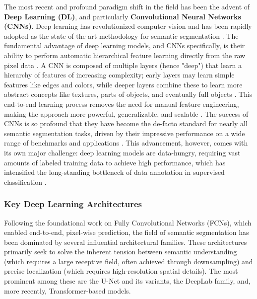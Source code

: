 \documentclass{report}
\begin{document}
The most recent and profound paradigm shift in the field has been the advent of \textbf{Deep Learning (DL)}, and particularly \textbf{Convolutional Neural Networks (CNNs)}. Deep learning has revolutionized computer vision and has been rapidly adopted as the state-of-the-art methodology for semantic segmentation \parencites[p.~311f.;]{KotaridisLazaridouRemotesensingimagesegmentationadvancesmetaanalysis2021a}[p.~1f.]{LeiEtAlDeeplearningimplementationimagesegmentationagriculturalapplicationscomprehensivereview2024}. The fundamental advantage of deep learning models, and CNNs specifically, is their ability to perform automatic hierarchical feature learning directly from the raw pixel data \parencites[p.~2]{NeupaneEtAlDeepLearningBasedSemanticSegmentationUrbanFeaturesSatelliteImagesReviewMetaAnalysis2021}. A CNN is composed of multiple layers (hence "deep") that learn a hierarchy of features of increasing complexity; early layers may learn simple features like edges and colors, while deeper layers combine these to learn more abstract concepts like textures, parts of objects, and eventually full objects \parencites[p.~3]{KaiserEtAlLearningAerialImageSegmentationOnlineMaps2017}. This end-to-end learning process removes the need for manual feature engineering, making the approach more powerful, generalizable, and scalable \parencites[p.~2]{KaiserEtAlLearningAerialImageSegmentationOnlineMaps2017}. The success of CNNs is so profound that they have become the de-facto standard for nearly all semantic segmentation tasks, driven by their impressive performance on a wide range of benchmarks and applications \parencites[p.~2]{KaiserEtAlLearningAerialImageSegmentationOnlineMaps2017}. This advancement, however, comes with its own major challenge: deep learning models are data-hungry, requiring vast amounts of labeled training data to achieve high performance, which has intensified the long-standing bottleneck of data annotation in supervised classification \parencites[p.~1]{KaiserEtAlLearningAerialImageSegmentationOnlineMaps2017}.
\subsubsection{Key Deep Learning Architectures}
Following the foundational work on Fully Convolutional Networks (FCNs), which enabled end-to-end, pixel-wise prediction, the field of semantic segmentation has been dominated by several influential architectural families. These architectures primarily seek to solve the inherent tension between semantic understanding (which requires a large receptive field, often achieved through downsampling) and precise localization (which requires high-resolution spatial details). The most prominent among these are the U-Net and its variants, the DeepLab family, and, more recently, Transformer-based models.
\end{document}
